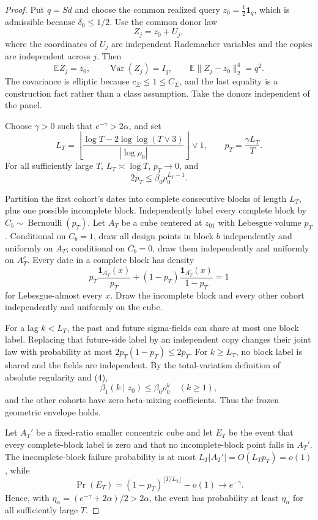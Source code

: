 \documentclass{article}
\begin{document}
\begin{proof}
Put \(q=Sd\) and choose the common realized query
\(z_0=\tfrac12\mathbf1_q\), which is admissible because \(\delta_0\le1/2\).  Use the common donor law
\[
 Z_j=z_0+U_j,                                                \tag{1}
\]
where the coordinates of \(U_j\) are independent Rademacher variables and the copies are independent across \(j\).  Then
\[
 \mathbb EZ_j=z_0,
 \qquad \operatorname{Var}(Z_j)=I_q,
 \qquad \mathbb E\|Z_j-z_0\|_2^4=q^2.                     \tag{2}
\]
The covariance is elliptic because \(c_\Sigma\le1\le C_\Sigma\), and the last equality is a construction fact rather than a class assumption.  Take the donors independent of the panel.

Choose \(\gamma>0\) such that \(e^{-\gamma}>2\alpha\), and set
\[
 L_T=\left\lfloor
 \frac{\log T-2\log\log(T\vee3)}{|\log\rho_0|}
 \right\rfloor\vee1,
 \qquad
 p_T=\frac{\gamma L_T}{T}.                                 \tag{3}
\]
For all sufficiently large \(T\), \(L_T\asymp\log T\), \(p_T\to0\), and
\[
 2p_T\le\beta_0\rho_0^{L_T-1}.                             \tag{4}
\]

Partition the first cohort's dates into complete consecutive blocks of length \(L_T\), plus one possible incomplete block.  Independently label every complete block by
\(C_b\sim\operatorname{Bernoulli}(p_T)\).  Let \(A_T\) be a cube centered at \(z_{01}\) with Lebesgue volume \(p_T\).  Conditional on \(C_b=1\), draw all design points in block \(b\) independently and uniformly on \(A_T\); conditional on \(C_b=0\), draw them independently and uniformly on \(A_T^c\).  Every date in a complete block has density
\[
 p_T\frac{\mathbf1_{A_T}(x)}{p_T}
 +(1-p_T)\frac{\mathbf1_{A_T^c}(x)}{1-p_T}=1               \tag{5}
\]
for Lebesgue-almost every \(x\).  Draw the incomplete block and every other cohort independently and uniformly on the cube.

For a lag \(k<L_T\), the past and future sigma-fields can share at most one block label.  Replacing that future-side label by an independent copy changes their joint law with probability at most \(2p_T(1-p_T)\le2p_T\).  For \(k\ge L_T\), no block label is shared and the fields are independent.  By the total-variation definition of absolute regularity and (4),
\[
 \beta_1(k\mid z_0)\le\beta_0\rho_0^k
 \quad(k\ge1),                                             \tag{6}
\]
and the other cohorts have zero beta-mixing coefficients.  Thus the frozen geometric envelope holds.

Let \(A_T'\) be a fixed-ratio smaller concentric cube and let \(E_T\) be the event that every complete-block label is zero and that no incomplete-block point falls in \(A_T'\).  The incomplete-block failure probability is at most \(L_T|A_T'|=O(L_Tp_T)=o(1)\), while
\[
 \Pr(E_T)=(1-p_T)^{\lfloor T/L_T\rfloor}-o(1)
 \longrightarrow e^{-\gamma}.                              \tag{7}
\]
Hence, with
\(\eta_\alpha=(e^{-\gamma}+2\alpha)/2>2\alpha\), the event has probability at least \(\eta_\alpha\) for all sufficiently large \(T\).


\end{proof}
\end{document}
